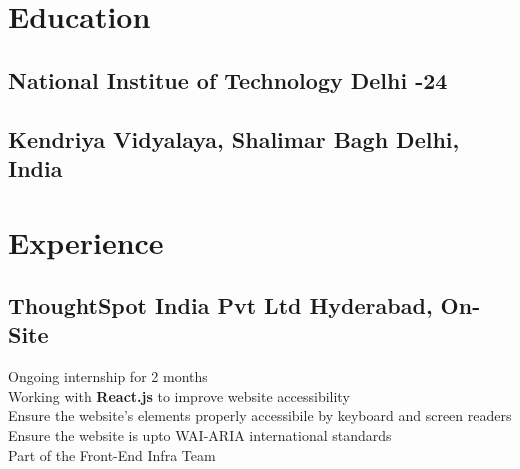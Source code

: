 \documentclass[]{Nikhil_Kadiyan_Resume}
\begin{document}

\descript{}

\section{Education}
\hrulefill

\subsection{National Institue of Technology Delhi \hfill {}-24}

\sectionsep

\subsection{Kendriya Vidyalaya, Shalimar Bagh \hfill \normalfont Delhi, India}

\sectionsep

\section{Experience} 
\hrulefill

\subsection{ThoughtSpot India Pvt Ltd \hfill \normalfont Hyderabad, On-Site}
\pt Ongoing internship for 2 months\\
\pt Working with  \textbf{React.js} to improve website accessibility\\
\pt Ensure the website's elements properly accessibile by keyboard and screen readers\\
\pt Ensure the website is upto WAI-ARIA international standards\\
\pt Part of the Front-End Infra Team\\
\sectionsep
\end{document}
